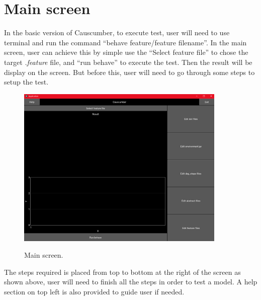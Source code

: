 \section{Main screen}
In the basic version of Causcumber, to execute test, user will need to use terminal and run the command “behave feature/{feature filename}”. In the main screen, user can achieve this by simple use the “Select feature file” to chose the target \textsl{.feature} file, and “run behave” to execute the test. Then the result will be display on the screen. But before this, user will need to go through some steps to setup the test.
\begin{figure}[H]
	\centering
	\includegraphics[width=10cm]{figures/mainScreen.png}\\
	\caption{Main screen.}
	\label{fig:figure12}
\end{figure}
The steps required is placed from top to bottom at the right of the screen as shown above, user will need to finish all the steps in order to test a model. A help section on top left is also provided to guide user if needed.

